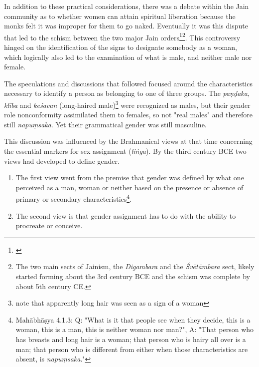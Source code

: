 In addition to these practical considerations, there was a debate within the Jain community as to whether women can attain spiritual liberation because the monks felt it was improper for them to go naked. Eventually it was this dispute that led to the schism between the two major Jain orders\footnote{\cite{dudas}}\footnote{The two main sects of Jainism, the {\em Digambara} and the {\em Śvētāmbara} sect, likely started forming about the 3rd century BCE and the schism was complete by about 5th century CE.}. This controversy hinged on the identification of the signs to designate somebody as a woman, which logically also led to the examination of what is male, and neither male nor female. 

The speculations and discussions that followed focused around the characteristics necessary to identify a person as belonging to one of three groups. The {\em paṇḍaka}, {\em klība} and {\em keśavan} (long-haired male)\footnote{note that apparently long hair was seen as a sign of a woman} were recognized as males, but their gender role nonconformity assimilated them to females, so not "real males" and therefore still {\em napuṃsaka}. Yet their grammatical gender was still masculine.

This discussion was influenced by the Brahmanical views at that time concerning the essential markers for sex assignment ({\em liṅga}). By the third century BCE two views had developed to define gender.
\begin{enumerate}
 \item The first view went from the premise that gender was defined by what one perceived as a man, woman or neither based on the presence or absence of primary or secondary characteristics\footnote{Mahābhāṣya 4.1.3: Q: "What is it that people see when they decide, this is a woman, this is a man, this is neither woman nor man?", A: "That person who has breasts and long hair is a woman; that person who is hairy all over is a man; that person who is different from either when those characteristics are absent, is {\em napuṃsaka}."}.
 \item The second view is that gender assignment has to do with the ability to procreate or conceive. 
\end{enumerate}

